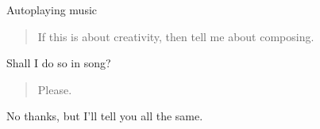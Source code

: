 Autoplaying music

\begin{quote}
If this is about creativity, then tell me about composing.
\end{quote}

Shall I do so in song?

\begin{quote}
Please.
\end{quote}

No thanks, but I'll tell you all the same.
